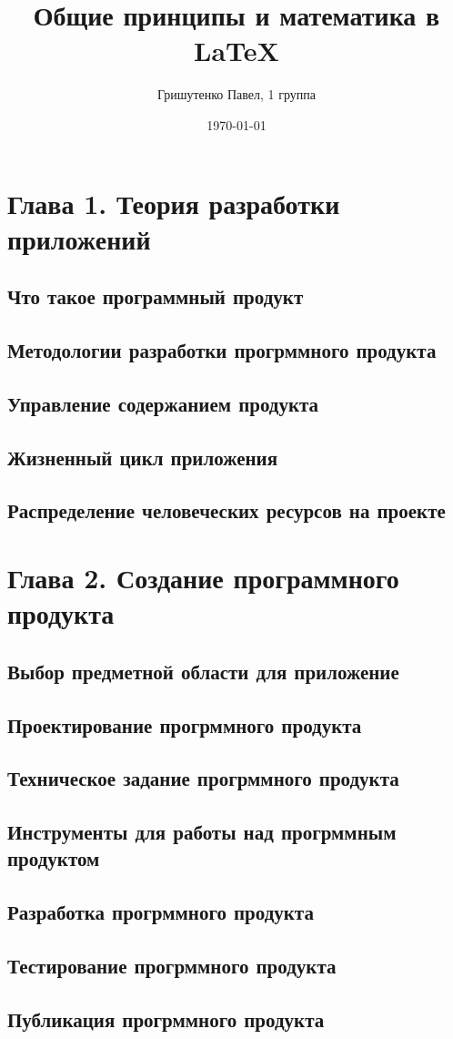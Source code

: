\documentclass[a4paper,12pt]{article} %
\author{Гришутенко Павел, 1 группа}
\title{Общие принципы и математика в \LaTeX{}}
\date{\today}
\begin{document}

\maketitle

\section{Глава 1. Теория разработки приложений}
\subsection{Что такое программный продукт}
\subsection{Методологии разработки прогрммного продукта}
\subsection{Управление содержанием продукта}
\subsection{Жизненный цикл приложения}
\subsection{Распределение человеческих ресурсов на проекте}
\section{Глава 2. Создание программного продукта}
\subsection{Выбор предметной области для приложение}
\subsection{Проектирование прогрммного продукта}
\subsection{Техническое задание прогрммного продукта}
\subsection{Инструменты для работы над прогрммным продуктом}
\subsection{Разработка прогрммного продукта}
\subsection{Тестирование прогрммного продукта}
\subsection{Публикация прогрммного продукта}
\end{document}

